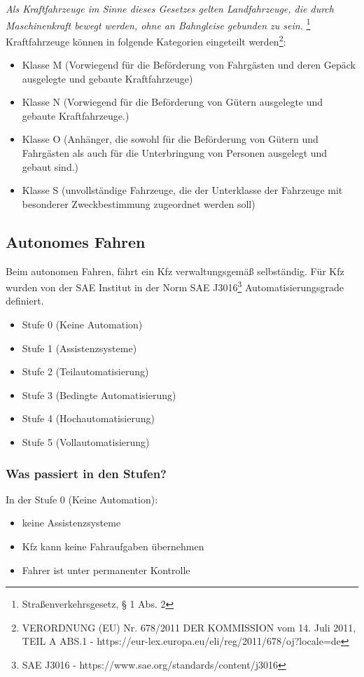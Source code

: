 \textit{Als Kraftfahrzeuge im Sinne dieses Gesetzes gelten Landfahrzeuge, die durch Maschinenkraft bewegt werden, ohne an Bahngleise gebunden zu sein.}
\footnote{Straßenverkehrsgesetz, § 1 Abs. 2}
\vspace{0.5cm}
\newline
Kraftfahrzeuge können in folgende Kategorien eingeteilt werden\footnote{VERORDNUNG (EU) Nr. 678/2011 DER KOMMISSION
	vom 14. Juli 2011, TEIL A ABS.1 - https://eur-lex.europa.eu/eli/reg/2011/678/oj?locale=de}:
\begin{itemize}
	\item Klasse M (Vorwiegend für die Beförderung von Fahrgästen und deren Gepäck ausgelegte und gebaute Kraftfahrzeuge)
	\item Klasse N (Vorwiegend für die Beförderung von Gütern ausgelegte und gebaute Kraftfahrzeuge.)
	\item Klasse O (Anhänger, die sowohl für die Beförderung von Gütern und Fahrgästen als auch für die Unterbringung von Personen ausgelegt und gebaut sind.)
	\item Klasse S (unvollständige Fahrzeuge, die der Unterklasse der Fahrzeuge mit besonderer Zweckbestimmung zugeordnet werden soll)
\end{itemize}


\subsection{Autonomes Fahren}

Beim autonomen Fahren, fährt ein \ac{Kfz} verwaltungsgemäß selbständig.
Für \ac{Kfz} wurden von der \ac{SAE} Institut in der Norm SAE J3016\footnote{SAE J3016 - https://www.sae.org/standards/content/j3016} Automatisierungsgrade definiert.
\begin{itemize}
	\item Stufe 0 (Keine Automation)
	\item Stufe 1 (Assistenzsysteme)
	\item Stufe 2 (Teilautomatisierung)
	\item Stufe 3 (Bedingte Automatisierung)
	\item Stufe 4 (Hochautomatisierung)
	\item Stufe 5 (Vollautomatisierung)
\end{itemize}
\subsubsection{Was passiert in den Stufen?}
In der Stufe 0 (Keine Automation):
\begin{itemize}
	\item keine Assistenzsysteme
	\item \ac{Kfz} kann keine Fahraufgaben übernehmen
	\item Fahrer ist unter permanenter Kontrolle
\end{itemize}

